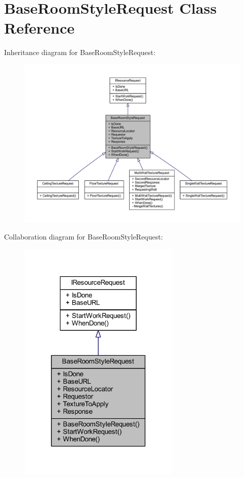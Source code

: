 \hypertarget{class_base_room_style_request}{}\section{Base\+Room\+Style\+Request Class Reference}
\label{class_base_room_style_request}


Inheritance diagram for Base\+Room\+Style\+Request\+:
\nopagebreak
\begin{figure}[H]
\begin{center}
\leavevmode
\includegraphics[width=350pt]{class_base_room_style_request__inherit__graph}
\end{center}
\end{figure}


Collaboration diagram for Base\+Room\+Style\+Request\+:
\nopagebreak
\begin{figure}[H]
\begin{center}
\leavevmode
\includegraphics[width=218pt]{class_base_room_style_request__coll__graph}
\end{center}
\end{figure}
